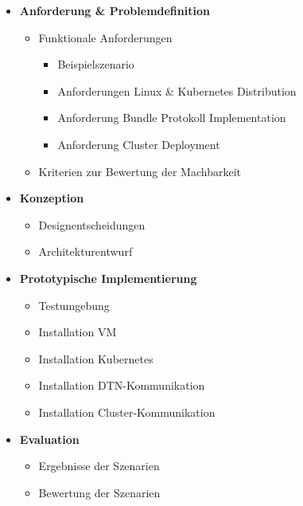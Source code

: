 \documentclass[
  ngerman,
  symmetric,
  cdfont=on,
  numbers=noenddot,
  parskip
]{tudscrreprt}
\begin{document}
\begin{itemize}[label=\textbullet, nosep]
  \item \textbf{Anforderung \& Problemdefinition }
    \begin{itemize}[label=--]
      \item Funktionale Anforderungen
        \begin{itemize}[label=--]
          \item Beispielszenario
          \item Anforderungen Linux \& Kubernetes Distribution
          \item Anforderung Bundle Protokoll Implementation
          \item Anforderung Cluster Deployment
        \end{itemize}
    \end{itemize}
    \begin{itemize}[label=--]
      \item Kriterien zur Bewertung der Machbarkeit
    \end{itemize}

  \item \textbf{Konzeption}
  \begin{itemize}[label=--]
    \item Designentscheidungen
    \item Architekturentwurf 
  \end{itemize}

  \item \textbf{Prototypische Implementierung}
    \begin{itemize}[label=--]
      \item Testumgebung
      \item Installation VM 
      \item Installation Kubernetes
      \item Installation DTN-Kommunikation
      \item Installation Cluster-Kommunikation
    \end{itemize}

  \item \textbf{Evaluation}
    \begin{itemize}[label=--]
      \item Ergebnisse der Szenarien
      \item Bewertung der Szenarien
    \end{itemize}


\end{itemize}
\end{document}
